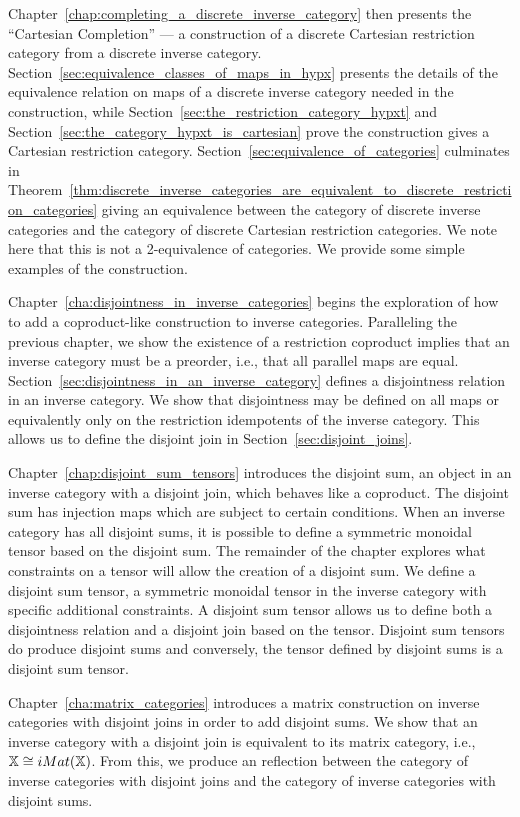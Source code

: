 Chapter~\ref{chap:completing_a_discrete_inverse_category} then presents the ``Cartesian
Completion'' --- a construction of a discrete Cartesian restriction category from a discrete
inverse category. Section~\ref{sec:equivalence_classes_of_maps_in_hypx} presents the details of the
equivalence relation on  maps of a discrete inverse category needed in the construction, while
Section~\ref{sec:the_restriction_category_hypxt} and
Section~\ref{sec:the_category_hypxt_is_cartesian} prove the construction gives a Cartesian
restriction category. Section~\ref{sec:equivalence_of_categories} culminates in
Theorem~\ref{thm:discrete_inverse_categories_are_equivalent_to_discrete_restriction_categories}
giving an equivalence between the category of discrete inverse categories and the
category of discrete Cartesian restriction categories. We note here that this is not a 2-equivalence
of categories. We provide some simple examples of the construction.


Chapter~\ref{cha:disjointness_in_inverse_categories} begins the exploration of how to add a
coproduct-like construction to inverse categories. Paralleling the previous chapter, we show the
existence of a restriction coproduct implies that an inverse category must be a preorder, i.e.,
that all parallel maps are equal. Section~\ref{sec:disjointness_in_an_inverse_category} defines a
disjointness relation in an inverse category. We show that disjointness may be defined on all maps
or equivalently only on the restriction idempotents of the inverse category. This allows us to
define the disjoint join in Section~\ref{sec:disjoint_joins}.

Chapter~\ref{chap:disjoint_sum_tensors} introduces the disjoint sum, an object in an inverse
category with a disjoint join, which behaves like a coproduct. The disjoint sum has injection maps
which are subject to certain conditions. When an inverse category has all disjoint sums, it is
possible to define a symmetric monoidal tensor based on the disjoint sum. The remainder of the
chapter explores what constraints on a tensor will allow the creation of  a disjoint sum. We define
a disjoint sum tensor, a symmetric monoidal tensor in the inverse category with specific additional
constraints. A disjoint sum tensor allows us to define both a disjointness relation and a disjoint
join based on the tensor. Disjoint sum tensors do produce disjoint sums and conversely, the tensor
defined by disjoint sums is a disjoint sum tensor.

Chapter~\ref{cha:matrix_categories} introduces a matrix construction on inverse categories with
disjoint joins in order to add disjoint sums. We show that an inverse category \X with a disjoint join
is equivalent to its matrix category, i.e., $\mathbb{X} \cong iMat({\mathbb{X}})$. From this,
we produce an reflection between the category of inverse categories with disjoint joins and the
category of inverse categories with disjoint sums.


